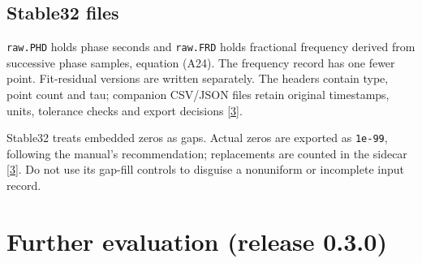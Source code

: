 \documentclass[11pt,a4paper]{article}
\newcommand{\stablemanual}{\href{http://www.stable32.com/Manual154.pdf}{[3]}}
\renewcommand{\_}{\usscore\allowbreak}
\begin{document}
\subsection{Stable32 files}
\texttt{raw.PHD} holds phase seconds and \texttt{raw.FRD} holds fractional
frequency derived from successive phase samples, equation (A24). The frequency record has one
fewer point. Fit-residual versions are written separately. The headers contain
type, point count and tau; companion CSV/JSON files retain original timestamps,
units, tolerance checks and export decisions \stablemanual.

Stable32 treats embedded zeros as gaps. Actual zeros are exported as
\texttt{1e-99}, following the manual's recommendation; replacements are counted
in the sidecar \stablemanual. Do not use its gap-fill controls to disguise a
nonuniform or incomplete input record.
\clearpage

\section{Further evaluation (release 0.3.0)}\label{sec:evaluation}
\end{document}
